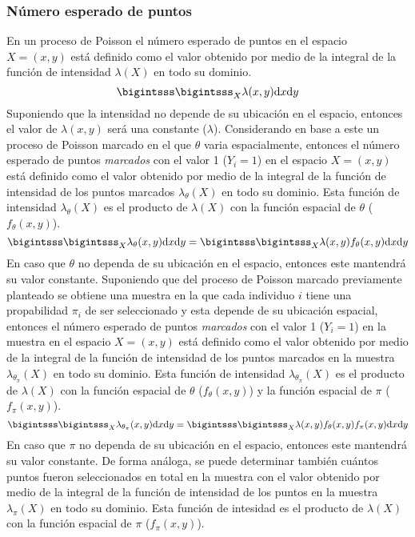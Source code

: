 \subsubsection{Número esperado de puntos}
En un proceso de Poisson el número esperado de puntos en el espacio $X=(x,y)$ está definido como el valor obtenido por medio de la integral de la función de intensidad $\lambda(X)$ en todo su dominio.
\begin{equation*}
    \bigintsss \bigintsss_{X} \lambda(x,y) \mathrm{d}x\mathrm{d}y
\end{equation*}
Suponiendo que la intensidad no depende de su ubicación en el espacio, entonces el valor de $\lambda(x,y)$ será una constante ($\lambda$). Considerando en base a este un proceso de Poisson marcado en el que $\theta$ varia espacialmente, entonces el número esperado de puntos \textit{marcados} con el valor 1 ($Y_i=1$) en el espacio $X=(x,y)$ está definido como el valor obtenido por medio de la integral de la función de intensidad de los puntos marcados $\lambda_\theta(X)$ en todo su dominio. Esta función de intensidad $\lambda_\theta(X)$ es el producto de $\lambda(X)$ con la función espacial de $\theta$ ($f_{\theta}(x,y)$).
\begin{equation*}
    \bigintsss\bigintsss_{X} \lambda_\theta(x,y) \mathrm{d}x\mathrm{d}y = \bigintsss\bigintsss_{X} \lambda(x,y) f_{\theta}(x,y)  \mathrm{d}x\mathrm{d}y
\end{equation*}
En caso que $\theta$ no dependa de su ubicación en el espacio, entonces este mantendrá su valor constante. Suponiendo que del proceso de Poisson marcado previamente planteado se obtiene una muestra en la que cada individuo $i$ tiene una propabilidad $\pi_i$ de ser seleccionado y esta depende de su ubicación espacial, entonces el número esperado de puntos \textit{marcados} con el valor 1 ($Y_i=1$) en la muestra en el espacio $X=(x,y)$ está definido como el valor obtenido por medio de la integral de la función de intensidad de los puntos marcados en la muestra $\lambda_{\theta_\pi}(X)$ en todo su dominio. Esta función de intensidad $\lambda_{\theta_\pi}(X)$ es el producto de $\lambda(X)$ con la función espacial de $\theta$ ($f_{\theta}(x,y)$) y la función espacial de $\pi$ ($f_{\pi}(x,y)$).
\begin{equation*}
    \bigintsss\bigintsss_{X} \lambda_{\theta_\pi}(x,y) \mathrm{d}x\mathrm{d}y =\bigintsss\bigintsss_{X} \lambda(x,y) f_{\theta}(x,y) f_{\pi}(x,y)  \mathrm{d}x\mathrm{d}y
\end{equation*}
En caso que $\pi$ no dependa de su ubicación en el espacio, entonces este mantendrá su valor constante. De forma análoga, se puede determinar también cuántos puntos fueron seleccionados en total en la muestra con el valor obtenido por medio de la integral de la función de intensidad de los puntos en la muestra$\lambda_\pi(X)$ en todo su dominio. Esta función de intesidad es el producto de $\lambda(X)$  con la función espacial de $\pi$ ($f_{\pi}(x,y)$).
